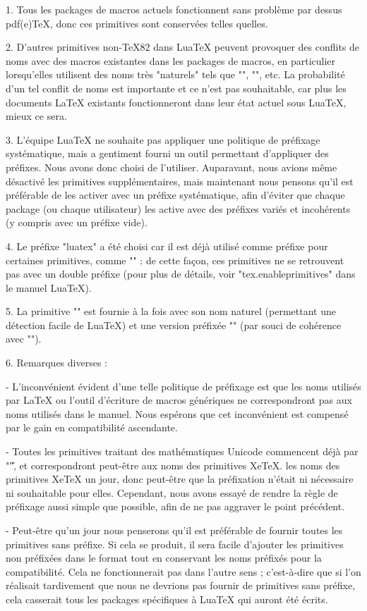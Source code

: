 \documentclass{lltxdoc}
\begin{document}
1. Tous les packages de macros actuels fonctionnent sans problème par dessus pdf(e)TeX, donc ces primitives sont conservées telles quelles.

2. D'autres primitives non-TeX82 dans LuaTeX peuvent provoquer des conflits de noms avec des macros existantes dans les packages de macros, en particulier lorsqu'elles utilisent des noms très "naturels" tels que "\outputbox", "\mathstyle", etc. La probabilité d'un tel conflit de noms est importante et ce n'est pas souhaitable, car plus les documents LaTeX existants fonctionneront dans leur état actuel sous LuaTeX, mieux ce sera.

3. L'équipe LuaTeX ne souhaite pas appliquer une politique de préfixage systématique, mais a gentiment fourni un outil permettant d'appliquer des préfixes. Nous avons donc choisi de l'utiliser. Auparavant, nous avions même désactivé les primitives supplémentaires, mais maintenant nous pensons qu'il est préférable de les activer avec un préfixe systématique, afin d'éviter que chaque package (ou chaque utilisateur) les active avec des préfixes variés et incohérents (y compris avec un préfixe vide).

4. Le préfixe "luatex" a été choisi car il est déjà utilisé comme préfixe pour certaines primitives, comme "\luatexversion" : de cette façon, ces primitives ne se retrouvent pas avec un double préfixe (pour plus de détails, voir "tex.enableprimitives" dans le manuel LuaTeX).

5. La primitive "\directlua" est fournie à la fois avec son nom naturel (permettant une détection facile de LuaTeX) et une version préfixée "\luatexdirectlua" (par souci de cohérence avec "\luatexlatelua").

6. Remarques diverses :

- L'inconvénient évident d'une telle politique de préfixage est que les noms utilisés par LaTeX ou l'outil d'écriture de macros génériques ne correspondront pas aux noms utilisés dans le manuel. Nous espérons que cet inconvénient est compensé par le gain en compatibilité ascendante.

- Toutes les primitives traitant des mathématiques Unicode commencent déjà par "\U", et correspondront peut-être aux noms des primitives XeTeX. les noms des primitives XeTeX un jour, donc peut-être que la préfixation n'était ni nécessaire ni souhaitable pour elles. Cependant, nous avons essayé de rendre la règle de préfixage aussi simple que possible, afin de ne pas aggraver le point précédent.

- Peut-être qu'un jour nous penserons qu'il est préférable de fournir toutes les primitives sans préfixe. Si cela se produit, il sera facile d'ajouter les primitives non préfixées dans le format tout en conservant les noms préfixés pour la compatibilité. Cela ne fonctionnerait pas dans l'autre sens ; c'est-à-dire que si l'on réalisait tardivement que nous ne devrions pas fournir de primitives sans préfixe, cela casserait tous les packages spécifiques à LuaTeX qui auront été écrits.
\end{document}
